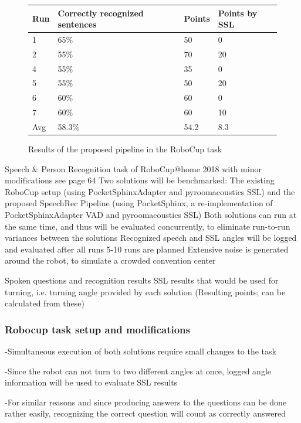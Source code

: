 \begin{figure}[ht]
	\begin{tabular}{ | l | l | l | l |}
		\hline
		Run & Correctly recognized sentences & Points & Points by SSL \\ \hline
		1 & 65\% & 50 &  0 \\ \hline
		2 & 55\% & 70 & 20 \\ \hline
		4 & 55\% & 35 &  0 \\ \hline
		5 & 55\% & 50 & 20 \\ \hline
		6 & 60\% & 60 &  0 \\ \hline
		7 & 60\% & 60 & 10 \\ \hhline{|=|=|=|=|} 
		Avg & 58.3\% & 54.2 & 8.3\\
		\hline
	\end{tabular}
	\caption{Results of the proposed pipeline in the RoboCup task}
	\label{pic:eval_task_results_new}
\end{figure}

Speech \& Person Recognition task of RoboCup@home 2018 with minor modifications see page 64
Two solutions will be benchmarked: The existing RoboCup setup (using PocketSphinxAdapter and pyroomacoustics SSL) and the proposed SpeechRec Pipeline  (using PocketSphinx, a re-implementation of PocketSphinxAdapter VAD and pyroomacoustics SSL)
Both solutions can run at the same time, and thus will be evaluated concurrently, to eliminate run-to-run variances between the solutions
Recognized speech and SSL angles will be logged and evaluated after all runs
5-10 runs are planned
Extensive noise is generated around the robot, to simulate a crowded convention center

Spoken questions and recognition results
SSL results that would be used for turning, i.e. turning angle provided by each solution
(Resulting points; can be calculated from these)

\subsubsection{Robocup task setup and modifications}
-Simultaneous execution of both solutions require small changes to the task

-Since the robot can not turn to two different angles at once, logged angle information will be used to evaluate SSL results

-For similar reasons and since producing answers to the questions can be done rather easily, recognizing the correct question will count as correctly answered


